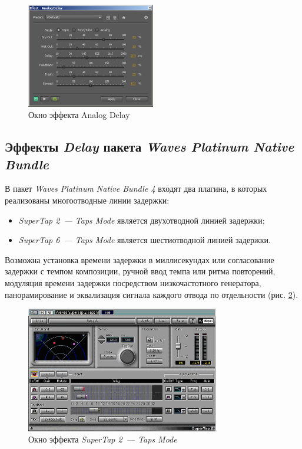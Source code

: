 \documentclass[oneside, final, 14pt]{extreport}
\begin{document}
\begin{figure}[h!]
  \centering
  \includegraphics[width=0.5\textwidth]{pic-audelay-02}
  \caption{Окно эффекта Analog Delay}
  \label{pic-audelay-02}
\end{figure}

\subsection{Эффекты \emph{Delay} пакета \emph{Waves Platinum Native Bundle}}
В пакет \emph{Waves Platinum Native Bundle 4} входят два плагина, в которых реализованы многоотводные линии задержки:
\begin{itemize}
  \item \emph{SuperTap 2~--- Taps Mode} является двухотводной линией задержки;
  \item \emph{SuperTap 6~--- Taps Mode} является шестиотводной линией задержки.
\end{itemize}

Возможна установка времени задержки в миллисекундах или согласование задержки с темпом композиции, ручной ввод темпа или ритма повторений, модуляция времени задержки посредством низкочастотного генератора, панорамирование и эквализация сигнала каждого отвода по отдельности (рис. \ref{pic-wavesdelay-01}).

\begin{figure}[h!]
  \centering
  \includegraphics[width=0.75\textwidth]{pic-wavesdelay-01}
  \caption{Окно эффекта \emph{SuperTap 2~--- Taps Mode}}
  \label{pic-wavesdelay-01}
\end{figure}
\end{document}
